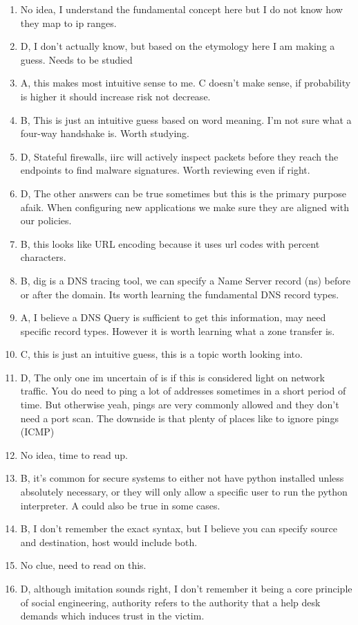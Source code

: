 \documentclass[11pt]{article}
\begin{document}
\begin{enumerate}
\item No idea, I understand the fundamental concept here but I do not know how they map to ip ranges.
\item D, I don't actually know, but based on the etymology here I am making a guess. Needs to be studied
\item A, this makes most intuitive sense to me. C doesn't make sense, if probability is higher it should increase risk not decrease.
\item B, This is just an intuitive guess based on word meaning. I'm not sure what a four-way handshake is. Worth studying.
\item D, Stateful firewalls, iirc will actively inspect packets before they reach the endpoints to find malware signatures. Worth reviewing even if right.
\item D, The other answers can be true sometimes but this is the primary purpose afaik. When configuring new applications we make sure they are aligned with our policies.
\item B, this looks like URL encoding because it uses url codes with percent characters.
\item B, dig is a DNS tracing tool, we can specify a Name Server record (ns) before or after the domain. Its worth learning the fundamental DNS record types.
\item A, I believe a DNS Query is sufficient to get this information, may need specific record types. However it is worth learning what a zone transfer is.
\item C, this is just an intuitive guess, this is a topic worth looking into.
\item D, The only one im uncertain of is if this is considered light on network traffic. You do need to ping a lot of addresses sometimes in a short period of time. But otherwise yeah, pings are very commonly allowed and they don't need a port scan. The downside is that plenty of places like to ignore pings (ICMP)
\item No idea, time to read up.
\item B, it's common for secure systems to either not have python installed unless absolutely necessary, or they will only allow a specific user to run the python interpreter. A could also be true in some cases.
\item B, I don't remember the exact syntax, but I believe you can specify source and destination, host would include both.
\item No clue, need to read on this.
\item D, although imitation sounds right, I don't remember it being a core principle of social engineering, authority refers to the authority that a help desk demands which induces trust in the victim.

\end{enumerate}
\end{document}
